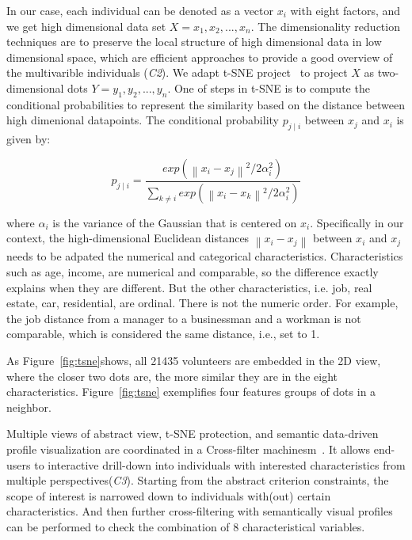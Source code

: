 In our case, each individual can be denoted as a vector $x_i$ with eight factors, and we get high dimensional data set $X={x_1, x_2, ..., x_n}$. The dimensionality reduction techniques are to preserve the local structure of high dimensional data in low dimensional space, which are efficient approaches to provide a good overview of the multivarible individuals (\textit{C2}). We adapt t-SNE project~\citep{maaten2008visualizing} to project $X$ as two-dimensional dots $Y={y_1, y_2, ..., y_n}$. One of steps in t-SNE is to compute the conditional probabilities to represent the similarity based on the distance between high dimenional datapoints. The conditional probability $p_{j\mid i}$ between $x_j$ and $x_i$ is given by:

\begin{equation}
p_{j\mid i} = \frac{exp({\left \| x_i - x_j \right \|}^2/2\alpha_i ^{2})}{\sum _{k\neq i}exp({\left \| x_i - x_k \right \|}^2/2\alpha_i ^{2})}
\end{equation}

where $\alpha_i$ is the variance of the Gaussian that is centered on $x_i$. Specifically in our context, the high-dimensional Euclidean distances $\left \| x_i - x_j \right \|$ between $x_i$ and $x_j$ needs to be adpated the numerical and categorical characteristics. Characteristics such as age, income, are numerical and comparable, so the difference exactly explains when they are different. But the other characteristics, i.e. job, real estate, car, residential, are ordinal. There is not the numeric order. For example, the job distance from a manager to a businessman and a workman is not comparable, which is considered the same distance, i.e., set to 1.


As Figure~\ref{fig:tsne}shows, all 21435 volunteers are embedded in the 2D view, where the closer two dots are, the more similar they are in the eight characteristics. Figure~\ref{fig:tsne} exemplifies four features groups of dots in a neighbor.

Multiple views of abstract view, t-SNE protection, and semantic data-driven profile visualization are coordinated in a Cross-filter machinesm~\citep{Weaver2010}. It allows end-users to interactive drill-down into individuals with interested characteristics from multiple perspectives(\textit{C3}). Starting from the abstract criterion constraints, the scope of interest is narrowed down to individuals with(out) certain characteristics. And then further cross-filtering with semantically visual profiles can be performed to check the combination of 8 characteristical variables.

